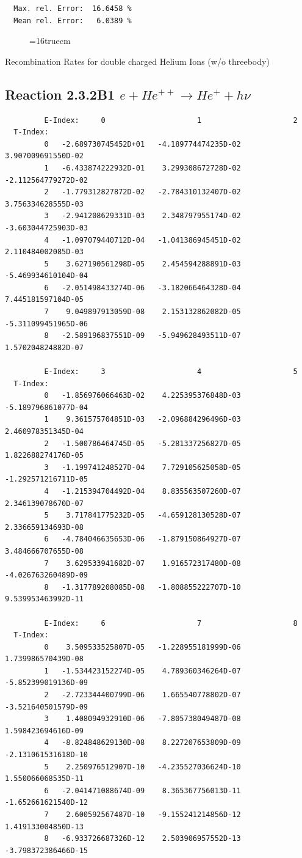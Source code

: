 \documentclass[12pt,dvips]{article}
\begin{document}
\begin{small}
\begin{verbatim}
  Max. rel. Error:  16.6458 %
  Mean rel. Error:   6.0389 %

\end{verbatim}\end{small}
\begin{figure} \label{2.3.2B0}
\epsfxsize=16truecm
\end{figure}
\newpage
  Recombination Rates for double charged Helium Ions (w/o threebody)

\subsection{
Reaction 2.3.2B1  $e + He^{++} \rightarrow He^+ + h\nu$
}


\begin{small}\begin{verbatim}
         E-Index:     0                     1                     2
  T-Index:
         0   -2.689730745452D+01   -4.189774474235D-02    3.907009691550D-02
         1   -6.433874222932D-01    3.299308672728D-02   -2.112564779272D-02
         2   -1.779312827872D-02   -2.784310132407D-02    3.756334628555D-03
         3   -2.941208629331D-03    2.348797955174D-02   -3.603044725903D-03
         4   -1.097079440712D-04   -1.041386945451D-02    2.110484002085D-03
         5    3.627190561298D-05    2.454594288891D-03   -5.469934610104D-04
         6   -2.051498433274D-06   -3.182066464328D-04    7.445181597104D-05
         7    9.049897913059D-08    2.153132862082D-05   -5.311099451965D-06
         8   -2.589196837551D-09   -5.949628493511D-07    1.570204824882D-07

         E-Index:     3                     4                     5
  T-Index:
         0   -1.856976066463D-02    4.225395376848D-03   -5.189796861077D-04
         1    9.361575704851D-03   -2.096884296496D-03    2.460978351345D-04
         2   -1.500786464745D-05   -5.281337256827D-05    1.822688274176D-05
         3   -1.199741248527D-04    7.729105625058D-05   -1.292571216711D-05
         4   -1.215394704492D-04    8.835563507260D-07    2.346139078670D-07
         5    3.717841775232D-05   -4.659128130528D-07    2.336659134693D-08
         6   -4.784046635653D-06   -1.879150864927D-07    3.484666707655D-08
         7    3.629533941682D-07    1.916572317480D-08   -4.026763260489D-09
         8   -1.317789208085D-08   -1.808855222707D-10    9.539953463992D-11

         E-Index:     6                     7                     8
  T-Index:
         0    3.509533525807D-05   -1.228955181999D-06    1.739986570439D-08
         1   -1.534423152274D-05    4.789360346264D-07   -5.852399019136D-09
         2   -2.723344400799D-06    1.665540778802D-07   -3.521640501579D-09
         3    1.408094932910D-06   -7.805738049487D-08    1.598423694616D-09
         4   -8.824848629130D-08    8.227207653809D-09   -2.131061531618D-10
         5    2.250976512907D-10   -4.235527036624D-10    1.550066068535D-11
         6   -2.041471088674D-09    8.365367756013D-11   -1.652661621540D-12
         7    2.600592567487D-10   -9.155241214856D-12    1.419133004850D-13
         8   -6.933726687326D-12    2.503906957552D-13   -3.798372386466D-15


\end{verbatim}
\end{small}
\end{document}
